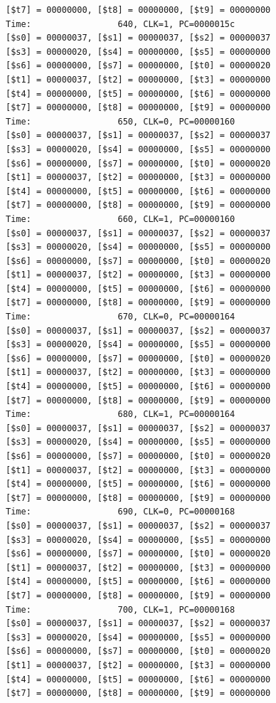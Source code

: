 \documentclass[a4paper,12pt]{article}
\begin{document}
\begin{lstlisting}
[$t7] = 00000000, [$t8] = 00000000, [$t9] = 00000000
Time:                 640, CLK=1, PC=0000015c
[$s0] = 00000037, [$s1] = 00000037, [$s2] = 00000037
[$s3] = 00000020, [$s4] = 00000000, [$s5] = 00000000
[$s6] = 00000000, [$s7] = 00000000, [$t0] = 00000020
[$t1] = 00000037, [$t2] = 00000000, [$t3] = 00000000
[$t4] = 00000000, [$t5] = 00000000, [$t6] = 00000000
[$t7] = 00000000, [$t8] = 00000000, [$t9] = 00000000
Time:                 650, CLK=0, PC=00000160
[$s0] = 00000037, [$s1] = 00000037, [$s2] = 00000037
[$s3] = 00000020, [$s4] = 00000000, [$s5] = 00000000
[$s6] = 00000000, [$s7] = 00000000, [$t0] = 00000020
[$t1] = 00000037, [$t2] = 00000000, [$t3] = 00000000
[$t4] = 00000000, [$t5] = 00000000, [$t6] = 00000000
[$t7] = 00000000, [$t8] = 00000000, [$t9] = 00000000
Time:                 660, CLK=1, PC=00000160
[$s0] = 00000037, [$s1] = 00000037, [$s2] = 00000037
[$s3] = 00000020, [$s4] = 00000000, [$s5] = 00000000
[$s6] = 00000000, [$s7] = 00000000, [$t0] = 00000020
[$t1] = 00000037, [$t2] = 00000000, [$t3] = 00000000
[$t4] = 00000000, [$t5] = 00000000, [$t6] = 00000000
[$t7] = 00000000, [$t8] = 00000000, [$t9] = 00000000
Time:                 670, CLK=0, PC=00000164
[$s0] = 00000037, [$s1] = 00000037, [$s2] = 00000037
[$s3] = 00000020, [$s4] = 00000000, [$s5] = 00000000
[$s6] = 00000000, [$s7] = 00000000, [$t0] = 00000020
[$t1] = 00000037, [$t2] = 00000000, [$t3] = 00000000
[$t4] = 00000000, [$t5] = 00000000, [$t6] = 00000000
[$t7] = 00000000, [$t8] = 00000000, [$t9] = 00000000
Time:                 680, CLK=1, PC=00000164
[$s0] = 00000037, [$s1] = 00000037, [$s2] = 00000037
[$s3] = 00000020, [$s4] = 00000000, [$s5] = 00000000
[$s6] = 00000000, [$s7] = 00000000, [$t0] = 00000020
[$t1] = 00000037, [$t2] = 00000000, [$t3] = 00000000
[$t4] = 00000000, [$t5] = 00000000, [$t6] = 00000000
[$t7] = 00000000, [$t8] = 00000000, [$t9] = 00000000
Time:                 690, CLK=0, PC=00000168
[$s0] = 00000037, [$s1] = 00000037, [$s2] = 00000037
[$s3] = 00000020, [$s4] = 00000000, [$s5] = 00000000
[$s6] = 00000000, [$s7] = 00000000, [$t0] = 00000020
[$t1] = 00000037, [$t2] = 00000000, [$t3] = 00000000
[$t4] = 00000000, [$t5] = 00000000, [$t6] = 00000000
[$t7] = 00000000, [$t8] = 00000000, [$t9] = 00000000
Time:                 700, CLK=1, PC=00000168
[$s0] = 00000037, [$s1] = 00000037, [$s2] = 00000037
[$s3] = 00000020, [$s4] = 00000000, [$s5] = 00000000
[$s6] = 00000000, [$s7] = 00000000, [$t0] = 00000020
[$t1] = 00000037, [$t2] = 00000000, [$t3] = 00000000
[$t4] = 00000000, [$t5] = 00000000, [$t6] = 00000000
[$t7] = 00000000, [$t8] = 00000000, [$t9] = 00000000

\end{lstlisting}
\end{document}
